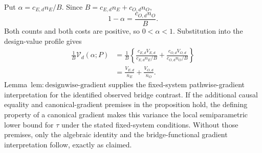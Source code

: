 Put \(\alpha=c_{E,d}n_E/B\).  Since \(B=c_{E,d}n_E+c_{O,d}n_O\),
\[
1-\alpha=\frac{c_{O,d}n_O}{B}.
\]
Both counts and both costs are positive, so \(0<\alpha<1\).  Substitution into the design-value profile gives
\[
\begin{aligned}
\frac1B\mathcal V_d(\alpha;P)
&=\frac1B\left\{
\frac{c_{E,d}V_{E,d}}{c_{E,d}n_E/B}
+\frac{c_{O,d}V_{O,d}}{c_{O,d}n_O/B}\right\}\\
&=\frac{V_{E,d}}{n_E}+\frac{V_{O,d}}{n_O}.
\end{aligned}
\]
Lemma~\(\mathrm{lem{:}designwise\text{-}gradient}\) supplies the fixed-system pathwise-gradient interpretation for the identified observed bridge contrast.  If the additional causal equality and canonical-gradient premises in the proposition hold, the defining property of a canonical gradient makes this variance the local semiparametric lower bound for \(\tau\) under the stated fixed-system conditions.  Without those premises, only the algebraic identity and the bridge-functional gradient interpretation follow, exactly as claimed.